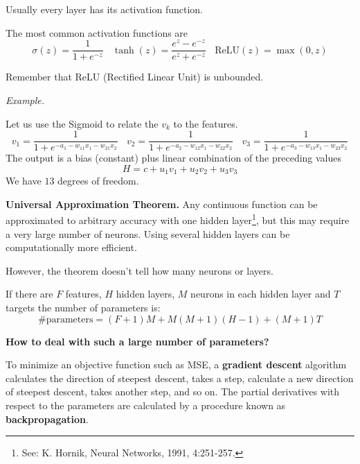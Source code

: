 Usually every layer has its activation function.


The most common activation functions are
\begin{equation*}
    \sigma ( z) =\frac{1}{1+e^{-z}} \ \ \ \ \tanh( z) =\frac{e^{z} -e^{-z}}{e^{z} +e^{-z}} \ \ \ \ \text{ReLU}( z) =\max( 0,z)
\end{equation*}


Remember that ReLU (Rectified Linear Unit) is unbounded.

\textit{Example.}


Let us use the Sigmoid to relate the $v_{k}$ to the features.
\begin{equation*}
    v_{1} =\frac{1}{1+e^{-a_{1} -w_{11} x_{1} -w_{21} x_{2}}} \ \ \ \ v_{2} =\frac{1}{1+e^{-a_{2} -w_{12} x_{1} -w_{22} x_{2}}} \ \ \ \ v_{3} =\frac{1}{1+e^{-a_{3} -w_{13} x_{1} -w_{23} x_{2}}}
\end{equation*}
The output is a bias (constant) plus linear combination of the preceding values
\begin{equation*}
    H=c+u_{1} v_{1} +u_{2} v_{2} +u_{3} v_{3}
\end{equation*}
We have $13$ degrees of freedom.

\textbf{Universal Approximation Theorem. }Any continuous function can be approximated to arbitrary accuracy with one hidden layer\footnote{See: K. Hornik, Neural Networks, 1991, 4:251-257.}, but this may require a very large number of neurons. Using several hidden layers can be computationally more efficient.

However, the theorem doesn't tell how many neurons or layers.

If there are $F$ features, $H$ hidden layers, $M$ neurons in each hidden layer and $T$ targets the number of parameters is:
\begin{equation*}
    \text{\#parameters} =( F+1) M+M( M+1)( H-1) +( M+1) T
\end{equation*}

\textbf{How to deal with such a large number of parameters?}

To minimize an objective function such as MSE, a \textbf{gradient descent} algorithm calculates the direction of steepest descent, takes a step, calculate a new direction of steepest descent, takes another step, and so on. The partial derivatives with respect to the parameters are calculated by a procedure known as \textbf{backpropagation}.

